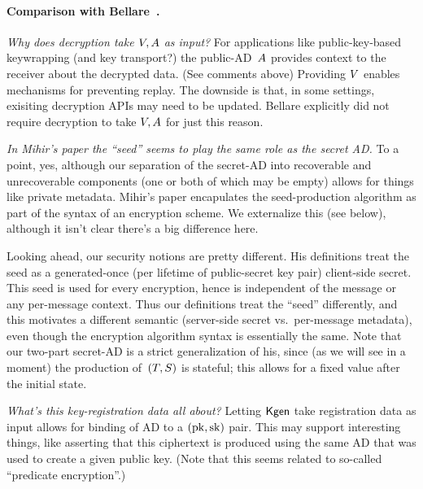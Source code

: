 \paragraph{Comparison with Bellare~\cite{mihir}.}

\emph{Why does decryption take $V,A$ as input?} For applications like public-key-based keywrapping (and key transport?) the public-AD~$A$ provides context to the receiver about the decrypted data. (See comments above)  Providing $V$ enables mechanisms for preventing replay.    The downside is that, in some settings, exisiting decryption APIs may need to be updated.  Bellare explicitly did not require decryption to take $V,A$ for just this reason.

\emph{In Mihir's paper the ``seed'' seems to play the same role as the secret AD.}  To a point, yes, although our separation of the secret-AD into recoverable and unrecoverable components (one or both of which may be empty) allows for things like private metadata.  Mihir's paper encapulates the seed-production algorithm as part of the syntax of an encryption scheme.  We externalize this (see below), although it isn't clear there's a big difference here.

Looking ahead, our security notions are pretty different.   His definitions treat the seed as a generated-once (per lifetime of public-secret key pair) client-side secret.  This seed is used for every encryption, hence is independent of the message or any per-message context.  Thus our definitions treat the ``seed'' differently, and this motivates a different semantic (server-side secret vs.\ per-message metadata), even though the encryption algorithm syntax is essentially the same.  Note that our two-part secret-AD is a strict generalization of his, since (as we will see in a moment) the production of~$(T,S)$ is stateful; this allows for a fixed value after the initial state. 

\emph{What's this key-registration data all about?} Letting $\mathsf{Kgen}$ take registration data as input allows for binding of AD to a $(\mathrm{pk},\mathrm{sk})$ pair.  This may support interesting things, like asserting that this ciphertext is produced using the same AD that was used to create a given public key.  (Note that this seems related to so-called ``predicate encryption''.)




